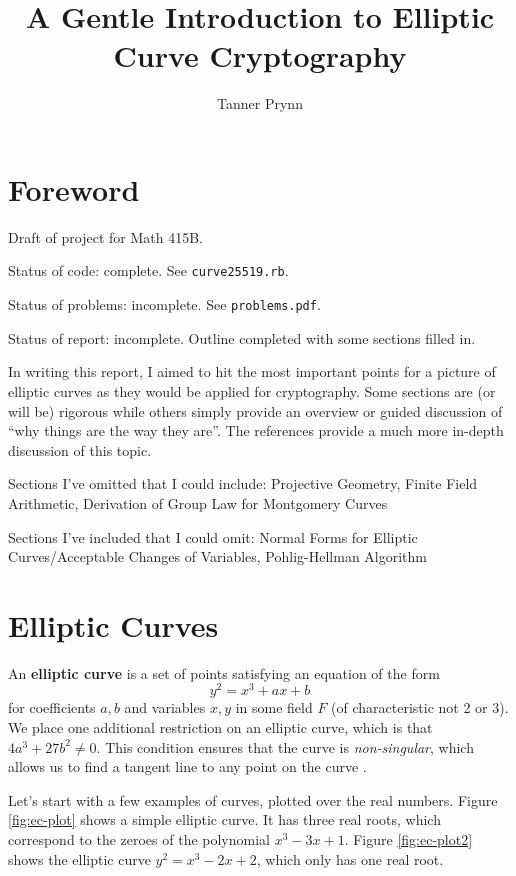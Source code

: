 \documentclass{article}
\begin{document}
\title{A Gentle Introduction to Elliptic Curve Cryptography}
\author{Tanner Prynn}
\maketitle

\tableofcontents
\clearpage

\section*{Foreword}
Draft of project for Math 415B.

Status of code: complete. See \texttt{curve25519.rb}.

Status of problems: incomplete. See \texttt{problems.pdf}.

Status of report: incomplete. Outline completed with some sections filled in.

In writing this report, I aimed to hit the most important points for a picture of elliptic curves as they would be applied for cryptography. 
Some sections are (or will be) rigorous while others simply provide an overview or guided discussion of ``why things are the way they are''. 
The references provide a much more in-depth discussion of this topic.

Sections I've omitted that I could include: Projective Geometry, Finite Field Arithmetic, Derivation of Group Law for Montgomery Curves

Sections I've included that I could omit: Normal Forms for Elliptic Curves/Acceptable Changes of Variables, Pohlig-Hellman Algorithm

\clearpage

\section{Elliptic Curves}
An \textbf{elliptic curve} is a set of points satisfying an equation of the form
$$y^2 = x^3 + ax + b$$
for coefficients $a,b$ and variables $x,y$ in some field $F$ (of characteristic not 2 or 3). 
We place one additional restriction on an elliptic curve, which is that
$4a^3 + 27b^2 \neq 0$.
This condition ensures that the curve is \textit{non-singular}, which allows us to find a tangent line to any point on the curve \cite[$\S$3.1]{ecc-guide}.

Let's start with a few examples of curves, plotted over the real numbers.
Figure \ref{fig:ec-plot} shows a simple elliptic curve.
It has three real roots, which correspond to the zeroes of the polynomial $x^3 - 3x + 1$.
Figure \ref{fig:ec-plot2} shows the elliptic curve $y^2 = x^3 - 2x + 2$, which only has one real root.
\end{document}
